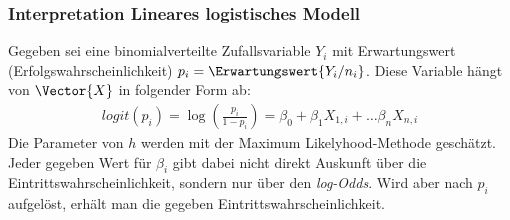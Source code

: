 \subsubsection{Interpretation Lineares logistisches Modell}
Gegeben sei eine binomialverteilte Zufallsvariable $Y_i$ mit Erwartungswert (Erfolgswahrscheinlichkeit) $p_i = \Erwartungswert{Y_i/n_i}$. Diese Variable hängt von $\Vector{X}$ in folgender Form ab: 
\begin{align}
	logit(p_i) = \log\left(\frac{p_i}{1-p_i} \right) = \beta_0 + \beta_1X_{1,i} + \dots \beta_n X_{n,i}
\end{align}
Die Parameter von $h$ werden mit der Maximum Likelyhood-Methode geschätzt. Jeder gegeben Wert für $\beta_i$ gibt dabei nicht direkt Auskunft über die Eintrittswahrscheinlichkeit, sondern nur über den \textit{log-Odds}. Wird aber nach $p_i$ aufgelöst, erhält man die gegeben Eintrittswahrscheinlichkeit. 


